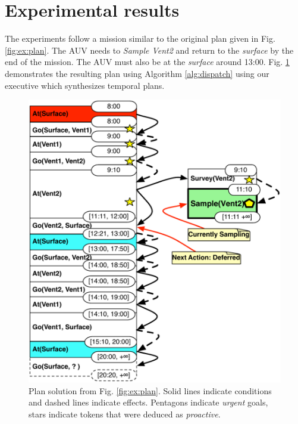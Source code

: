 \section{Experimental results}
\label{sec:exp}

The experiments follow a mission similar to the original plan given in
Fig. \ref{fig:ex:plan}. The AUV needs to {\em Sample Vent2} and return
to the {\em surface} by the end of the mission. The AUV must also be
at the {\em surface} around
13:00. %
Fig. \ref{fig:ex:mixed1} demonstrates the resulting plan using
Algorithm \ref{alg:dispatch} using our executive \rx which synthesizes
temporal plans.

\begin{figure}[!htbp]
  \centering
  \includegraphics[width=0.8\columnwidth]{figs/example_MixedInitial}
  \caption{\small Plan solution from Fig. \ref{fig:ex:plan}. Solid
    lines indicate conditions and dashed lines indicate
    effects. Pentagons indicate {\em urgent} goals, stars indicate
    tokens that were deduced as {\em proactive}.}
  \label{fig:ex:mixed1}
\end{figure}



